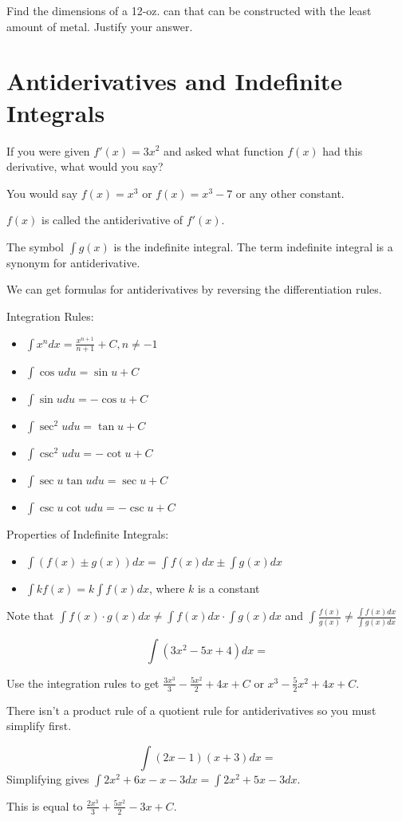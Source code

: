 \documentclass[../bccalc.tex]{subfiles}
\begin{document}
\ex Find the dimensions of a 12-oz. can that can be constructed with the least amount of metal. Justify your answer.

\section{Antiderivatives and Indefinite Integrals}
If you were given $f'(x)=3x^2$ and asked what function $f(x)$ had this derivative, what would you say?

You would say $f(x)=x^3$ or $f(x)=x^3-7$ or any other constant.

$f(x)$ is called the antiderivative of $f'(x)$.

The symbol $\int g(x)$ is the indefinite integral. The term indefinite integral is a synonym for antiderivative.

We can get formulas for antiderivatives by reversing the differentiation rules.

Integration Rules:
\begin{itemize}
    \item $\int x^n dx = \frac{x^{n+1}}{n+1}+C, n\neq -1$
    \item $\int \cos u du=\sin u+C$
    \item $\int \sin u du=-\cos u+C$
    \item $\int \sec^2 u du = \tan u +C$
    \item $\int \csc^2 u du = -\cot u +C$
    \item $\int \sec u \tan u du = \sec u +C$
    \item $\int \csc u \cot u du = -\csc u +C$
\end{itemize}

Properties of Indefinite Integrals:
\begin{itemize}
    \item $\int (f(x)\pm g(x))dx = \int f(x)dx \pm \int g(x)dx$
    \item $\int kf(x)=k\int f(x)dx$, where $k$ is a constant 
\end{itemize}
Note that $\int f(x)\cdot g(x)dx\neq \int f(x)dx\cdot \int g(x)dx$ and $\int \frac{f(x)}{g(x)}\neq \frac{\int f(x)dx}{\int g(x)dx}$

\begin{example}
    \[ \int (3x^2-5x+4)dx =\]

    Use the integration rules to get $\frac{3x^3}{3}-\frac{5x^2}{2}+4x+C$ or $x^3-\frac{5}{2}x^2+4x+C$.
\end{example}

There isn't a product rule of a quotient rule for antiderivatives so you must simplify first.
\begin{example}
    \[ \int (2x-1)(x+3)dx = \]
    Simplifying gives $\int 2x^2+6x-x-3 dx = \int 2x^2+5x-3dx$.

    This is equal to $\frac{2x^3}{3}+\frac{5x^2}{2}-3x+C$.
\end{example}
\end{document}
